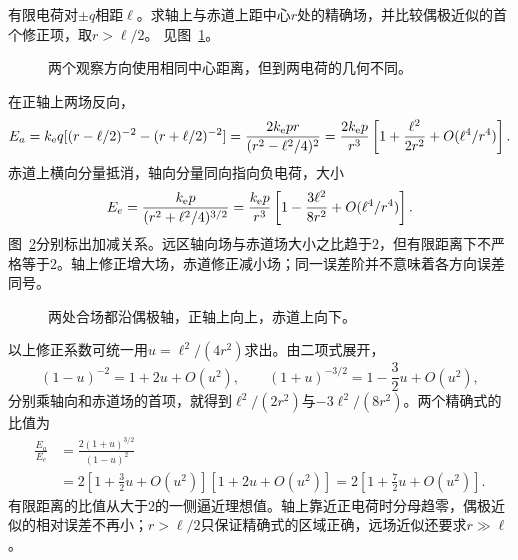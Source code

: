 \begin{exercise}[偶极轴上与赤道上的远场]\label{ex:es1-h5}
有限电荷对$\pm q$相距$\ell$。求轴上与赤道上距中心$r$处的精确场，并比较偶极近似的首个修正项，取$r>\ell/2$。 见图~\ref{fig:es1-h5-q}。
\end{exercise}

\begin{figure}[H]\centering
{}
\caption{两个观察方向使用相同中心距离，但到两电荷的几何不同。}\label{fig:es1-h5-q}
\end{figure}
\begin{solution}
在正轴上两场反向，
\[E_a=k_{\rm e} q[(r-\ell/2)^{-2}-(r+\ell/2)^{-2}]
=\frac{2k_{\rm e} pr}{(r^2-\ell^2/4)^2}
=\frac{2k_{\rm e} p}{r^3}\left[1+\frac{\ell^2}{2r^2}+O(\ell^4/r^4)\right].\]
赤道上横向分量抵消，轴向分量同向指向负电荷，大小
\[E_e=\frac{k_{\rm e} p}{(r^2+\ell^2/4)^{3/2}}
=\frac{k_{\rm e} p}{r^3}\left[1-\frac{3\ell^2}{8r^2}+O(\ell^4/r^4)\right].\]
图~\ref{fig:es1-h5-s}分别标出加减关系。远区轴向场与赤道场大小之比趋于$2$，但有限距离下不严格等于$2$。轴上修正增大场，赤道修正减小场；同一误差阶并不意味着各方向误差同号。
\begin{figure}[H]\centering
{}
\caption{两处合场都沿偶极轴，正轴上向上，赤道上向下。}\label{fig:es1-h5-s}
\end{figure}


以上修正系数可统一用$u=\ell^2/(4r^2)$求出。由二项式展开，
\[(1-u)^{-2}=1+2u+O(u^2),\qquad
(1+u)^{-3/2}=1-\frac32u+O(u^2),\]
分别乘轴向和赤道场的首项，就得到$\ell^2/(2r^2)$与$-3\ell^2/(8r^2)$。两个精确式的比值为
\[\begin{aligned}
\frac{E_a}{E_e}&=\frac{2(1+u)^{3/2}}{(1-u)^2}\\
&=2\left[1+\frac32u+O(u^2)\right]
\left[1+2u+O(u^2)\right]
=2\left[1+\frac72u+O(u^2)\right].
\end{aligned}\]
有限距离的比值从大于$2$的一侧逼近理想值。轴上靠近正电荷时分母趋零，偶极近似的相对误差不再小；$r>\ell/2$只保证精确式的区域正确，远场近似还要求$r\gg\ell$。
\end{solution}

